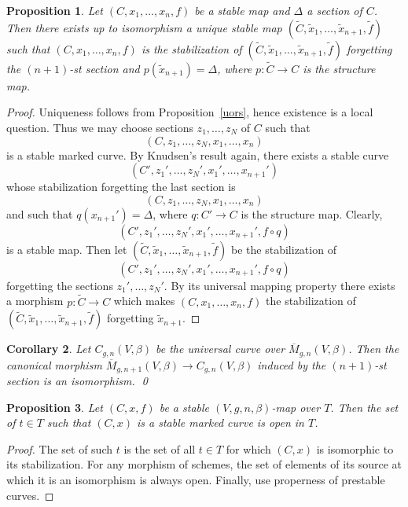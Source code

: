 \documentclass[11pt]{amsart}
\newtheorem{prop}{Proposition}[section]
\newtheorem{cor}[prop]{Corollary}
\theoremstyle{definition}
\theoremstyle{remark}
\newenvironment{pf}{\begin{proof}}{\end{proof}}
\renewcommand{\tilde}{\widetilde}
\newcommand{\comp}{\mathbin{{\scriptstyle\circ}}}
\newcommand{\ol}{\overline}
\theoremstyle{plain}
\theoremstyle{definition}
\theoremstyle{remark}
\begin{document}
\begin{prop} \label{flpuc}
Let \((C,x_1,\ldots,x_n,f)\) be a stable map and \(\Delta\) a section of \(C\). Then
there exists up to isomorphism a unique
stable map \((\tilde{C},\tilde{x}_1,\ldots,\tilde{x}_{n+1},\tilde{f})\) such that
\((C,x_1,\ldots,x_n,f)\) is the
stabilization of \((\tilde{C},\tilde{x}_1,\ldots,\tilde{x}_{n+1},\tilde{f})\)
forgetting the \((n+1)\)-st section and
\(p(\tilde{x}_{n+1})=\Delta\), where \(p:\tilde{C}\rightarrow C\) is the structure
map.
\end{prop}
\begin{pf}
Uniqueness follows from Proposition~\ref{uors}, hence existence is a local
question. Thus we may choose sections
\(z_1,\ldots,z_N\) of \(C\) such that
\[
(C,z_1,\ldots,z_N,x_1,\ldots,x_n)
\]
is a
stable marked curve. By Knudsen's result
again, there exists a stable curve
\[
(C',z_1',\ldots,z_N',x_1',\ldots,x_{n+1}')
\]
whose stabilization forgetting
the last
section is
\[
(C,z_1,\ldots,z_N,x_1,\ldots,x_n)
\]
and such that
\(q(x_{n+1}')=\Delta\), where \(q:C'\rightarrow C\) is the
structure map. Clearly,
\[
(C',z_1',\ldots,z_N',x_1',\ldots,x_{n+1}',f\comp q)
\]
is a stable map. Then let
\((\tilde{C},\tilde{x}_1,\ldots,\tilde{x}_{n+1},\tilde{f})\) be the stabilization
of
\[
(C',z_1',\ldots,z_N',x_1',\ldots,x_{n+1}',f\comp q)
\]
forgetting the sections
\(z_1',\ldots,z_N'\). By its universal
mapping property there exists a morphism \(p:\tilde{C}\rightarrow C\) which makes
\((C,x_1,\ldots,x_n,f)\) the stabilization of
\((\tilde{C},\tilde{x}_1,\ldots,\tilde{x}_{n+1},\tilde{f})\) forgetting
\(\tilde{x}_{n+1}\).
\end{pf}

\begin{cor} \label{esuc}
Let \(C_{g,n}(V,\beta)\) be the universal curve over \(\ol{M}_{g,n}(V,\beta)\).
Then the canonical morphism
\(\ol{M}_{g,n+1}(V,\beta)\rightarrow C_{g,n}(V,\beta)\) induced by the \((n+1)\)-st
section is an isomorphism. \qed
\end{cor}

\begin{prop}
Let \((C,x,f)\) be a stable \((V,g,n,\beta)\)-map over \(T\). Then the set of \(t\in
T\) such that \((C,x)\) is a stable marked
curve is open in \(T\).
\end{prop}
\begin{pf}
The set of such \(t\) is the set of all \(t\in T\) for which \((C,x)\) is isomorphic
to its stabilization. For any morphism of
schemes, the set of elements of its source at which it is an isomorphism is
always open. Finally, use properness of
prestable curves.
\end{pf}
\end{document}
